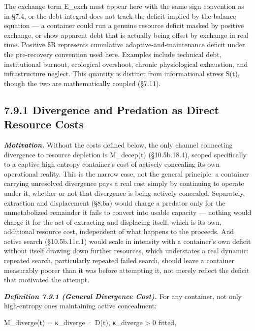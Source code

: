 \documentclass[
]{article}
\begin{document}
The exchange term E\_exch must appear here with the same sign convention
as in §7.4, or the debt integral does not track the deficit implied by
the balance equation --- a container could run a genuine resource
deficit masked by positive exchange, or show apparent debt that is
actually being offset by exchange in real time. Positive δR represents
cumulative adaptive-and-maintenance deficit under the pre-recovery
convention used here. Examples include technical debt, institutional
burnout, ecological overshoot, chronic physiological exhaustion, and
infrastructure neglect. This quantity is distinct from informational
stress S(t), though the two are mathematically coupled (§7.11).

\hypertarget{divergence-and-predation-as-direct-resource-costs}{%
\subsection{7.9.1 Divergence and Predation as Direct Resource
Costs}\label{divergence-and-predation-as-direct-resource-costs}}

\emph{\textbf{Motivation.}} Without the costs defined below, the only
channel connecting divergence to resource depletion is M\_decep(t)
(§10.5b.18.4), scoped specifically to a captive high-entropy container's
cost of actively concealing its own operational reality. This is the
narrow case, not the general principle: a container carrying unresolved
divergence pays a real cost simply by continuing to operate under it,
whether or not that divergence is being actively concealed. Separately,
extraction and displacement (§8.6a) would charge a predator only for the
unmetabolized remainder it fails to convert into usable capacity ---
nothing would charge it for the act of extracting and displacing itself,
which is its own, additional resource cost, independent of what happens
to the proceeds. And active search (§10.5b.11c.1) would scale in
intensity with a container's own deficit without itself drawing down
further resources, which understates a real dynamic: repeated search,
particularly repeated failed search, should leave a container measurably
poorer than it was before attempting it, not merely reflect the deficit
that motivated the attempt.

\emph{\textbf{Definition 7.9.1 (General Divergence Cost).}} For any
container, not only high-entropy ones maintaining active concealment:

M\_diverge(t) = κ\_diverge · D(t), κ\_diverge \textgreater{} 0 fitted,
\end{document}

